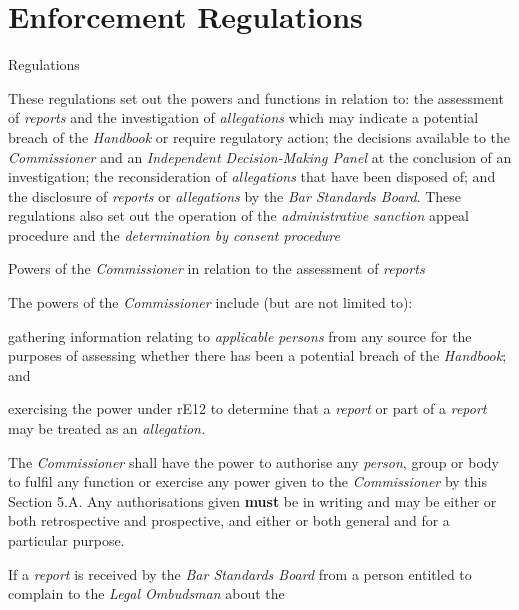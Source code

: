 \part{Enforcement Regulations}


Regulations


These regulations set out the powers and functions in relation to: the
assessment of \emph{reports} and the investigation
of \emph{allegations} which may indicate a potential breach of
the \emph{Handbook} or require regulatory action; the decisions
available to the \emph{Commissioner }and an\emph{ Independent
Decision-Making Panel }at the conclusion of an investigation; the
reconsideration of \emph{allegations} that have been disposed of; and
the disclosure of \emph{reports} or \emph{allegations} by the \emph{Bar
Standards Board}. These regulations also set out the operation of
the \emph{administrative sanction }appeal procedure and
the \emph{determination by consent procedure}\par
{}\par
Powers of the \emph{Commissioner} in relation to the assessment
of \emph{reports}\par
{}\par
The powers of the \emph{Commissioner} include (but are not limited
to):\\\nl \item gathering information relating to \emph{applicable persons} from any
source for the purposes of assessing whether there has been a potential
breach of the \emph{Handbook}; and\item exercising the power under rE12 to determine that a \emph{report} or
part of a \emph{report} may be treated as an \emph{allegation.}\ln
{}\par
The \emph{Commissioner} shall have the power to authorise
any \emph{person}, group or body to fulfil any function or exercise any
power given to the \emph{Commissioner} by this Section 5.A. Any
authorisations given  \textcolor{myred}{\textbf{must}} be in writing and may be either or both
retrospective and prospective, and either or both general and for a
particular purpose.\\
\par
{}\par
If a \emph{report} is received by the \emph{Bar Standards Board} from a
person entitled to complain to the \emph{Legal Ombudsman} about the
